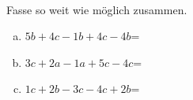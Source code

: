 \begin{aufgabe} ~ \\ 
Fasse so weit wie möglich zusammen.\begin{enumerate}[a)] 
\item 
$5b+4c-1b+4c-4b$=
\item 
$3c+2a-1a+5c-4c$=
\item 
$1c+2b-3c-4c+2b$=
\end{enumerate} 
\end{aufgabe} 
